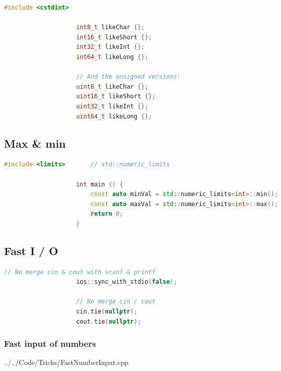 \documentclass[11pt, fleqn]{report}                             %
\theoremstyle{break}                                            %
\begin{document}
\begin{multicols}{2}
                \begin{lstlisting}[language=C++, gobble=20]
                    #include <cstdint>
                    
                    int8_t likeChar {};
                    int16_t likeShort {};
                    int32_t likeInt {};
                    int64_t likeLong {};

                    // And the unsigned versions:
                    uint8_t likeChar {};
                    uint16_t likeShort {};
                    uint32_t likeInt {};
                    uint64_t likeLong {};
                \end{lstlisting}

            \subsection{Max \& min}

                \begin{lstlisting}[language=C++, gobble=20]
                    #include <limits>       // std::numeric_limits
                    
                    int main () {
                        const auto minVal = std::numeric_limits<int>::min();
                        const auto maxVal = std::numeric_limits<int>::max();
                        return 0;
                    }
                \end{lstlisting}


            \subsection{Fast I / O}

                \begin{lstlisting}[language=C++, gobble=20]
                    // No merge cin & cout with scanf & printf
                    ios::sync_with_stdio(false);
                    
                    // No merge cin / cout
                    cin.tie(nullptr);
                    cout.tie(nullptr);
                \end{lstlisting}

                \subsubsection{Fast input of numbers}

                    
                    {../../Code/Tricks/FastNumberInput.cpp}
            

\end{multicols}
\end{document}
